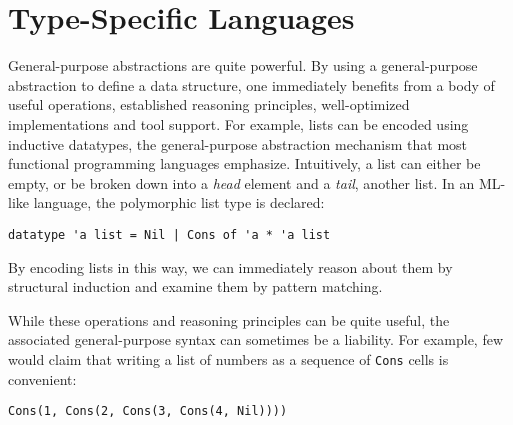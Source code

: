 \let\li\lstinline

\section{Type-Specific Languages}\label{aparsing}
General-purpose abstractions are quite powerful. By using a general-purpose abstraction to define a data structure, one immediately benefits from a body of useful operations, established reasoning principles, well-optimized implementations and tool support. For example, lists can be encoded using inductive datatypes, the general-purpose abstraction mechanism that most functional programming languages emphasize. Intuitively, a list can either be empty, or be broken down into a \emph{head} element and a \emph{tail}, another list. In an ML-like language, the polymorphic list type is declared:
\begin{lstlisting}[numbers=none]
datatype 'a list = Nil | Cons of 'a * 'a list
\end{lstlisting}
By encoding lists in this way, we can immediately reason about them by structural induction and examine them by pattern matching. %

While these operations and reasoning principles can be quite useful, the associated general-purpose syntax can sometimes be a liability. For example, few would claim that writing a list of numbers as a sequence of \li{Cons} cells is convenient:
\begin{lstlisting}[numbers=none]
Cons(1, Cons(2, Cons(3, Cons(4, Nil))))
\end{lstlisting}

